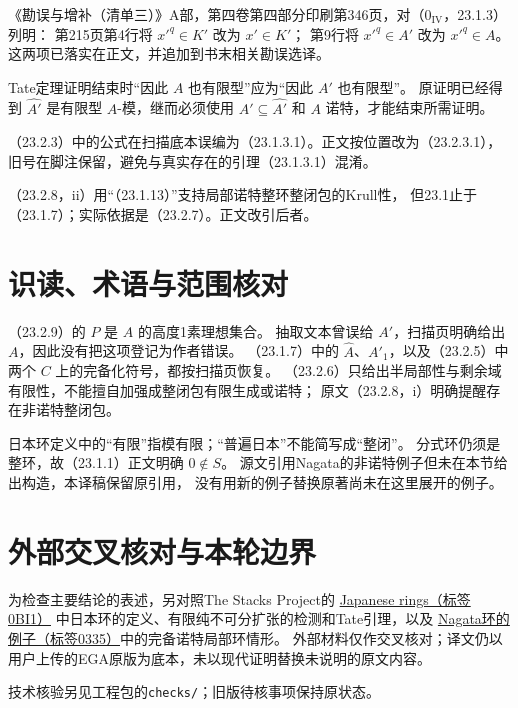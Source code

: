 《勘误与增补（清单三）》A部，第四卷第四部分印刷第346页，对（$0_{\mathrm{IV}}$，23.1.3）列明：
第215页第4行将 $x'^q\in K'$ 改为 $x'\in K'$；
第9行将 $x'^q\in A'$ 改为 $x'^q\in A$。
这两项已落实在正文，并追加到书末相关勘误选译。

Tate定理证明结束时“因此 $A$ 也有限型”应为“因此 $A'$ 也有限型”。
原证明已经得到 $\widehat{A'}$ 是有限型 $A$-模，继而必须使用
$A'\subseteq\widehat{A'}$ 和 $A$ 诺特，才能结束所需证明。

（23.2.3）中的公式在扫描底本误编为（23.1.3.1）。正文按位置改为（23.2.3.1），
旧号在脚注保留，避免与真实存在的引理（23.1.3.1）混淆。

（23.2.8，ii）用“（23.1.13）”支持局部诺特整环整闭包的Krull性，
但23.1止于（23.1.7）；实际依据是（23.2.7）。正文改引后者。

\section*{识读、术语与范围核对}
（23.2.9）的 $P$ 是 $A$ 的高度1素理想集合。
抽取文本曾误给 $A'$，扫描页明确给出 $A$，因此没有把这项登记为作者错误。
（23.1.7）中的 $\widehat A$、$A'_1$，以及（23.2.5）中两个 $C$ 上的完备化符号，都按扫描页恢复。
（23.2.6）只给出半局部性与剩余域有限性，不能擅自加强成整闭包有限生成或诺特；
原文（23.2.8，i）明确提醒存在非诺特整闭包。

日本环定义中的“有限”指模有限；“普遍日本”不能简写成“整闭”。
分式环仍须是整环，故（23.1.1）正文明确 $0\notin S$。
源文引用Nagata的非诺特例子但未在本节给出构造，本译稿保留原引用，
没有用新的例子替换原著尚未在这里展开的例子。

\section*{外部交叉核对与本轮边界}
为检查主要结论的表述，另对照The Stacks Project的
\href{https://stacks.math.columbia.edu/tag/0BI1}{Japanese rings（标签0BI1）}
中日本环的定义、有限纯不可分扩张的检测和Tate引理，以及
\href{https://stacks.math.columbia.edu/tag/0335}{Nagata环的例子（标签0335）}中的完备诺特局部环情形。
外部材料仅作交叉核对；译文仍以用户上传的EGA原版为底本，未以现代证明替换未说明的原文内容。

技术核验另见工程包的\texttt{checks/}；旧版待核事项保持原状态。
